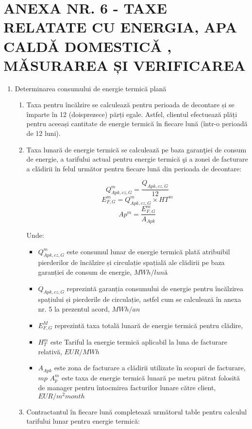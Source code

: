 \section{ANEXA NR. 6 - TAXE RELATATE CU ENERGIA, APA CALDĂ DOMESTICĂ , MĂSURAREA ȘI VERIFICAREA}

\begin{enumerate}

\item Determinarea consumului de energie termică plană

  \begin{enumerate}
  \item Taxa pentru încălzire se calculează pentru perioada de decontare și se împarte în 12 (doisprezece) părți egale. Astfel, clientul efectuează plăți pentru aceeași cantitate de energie termică în fiecare lună (într-o perioadă de 12 luni).
  \item  Taxa lunară de energie termică se calculează pe  baza garanţiei de consum de energie, a tarifului actual pentru  energie termică şi a zonei de facturare a clădirii în felul următor pentru fiecare lună din perioada de decontare:

\[ Q^{m}_{Apk,cz,G} = \frac{Q_{Apk,cz,G}}{12} \]
\[ E^{m}_{F,G} = Q^{m}_{Apk,cz,G} \times HT^m \]
\[ Ap^m = \frac{E^{m}_{F,G} }{A_{Apk}} \]

Unde:
\begin{itemize}[label={}]
  \item $Q^{m}_{Apk,cz, G}$ \quad este consumul lunar de energie termică plată atribuibil pierderilor de încălzire și circulație spațială ale clădirii pe baza garanției de consum de energie, $MWh/lună$
  \item $Q_{Apk,cz, G}$ \quad reprezintă garanția consumului de energie pentru încălzirea spațiului și   pierderile de circulație, astfel cum se calculează în anexa nr. 5 la prezentul acord, $MWh/an$
  \item $E^{M}_{F, G}$ \quad reprezintă taxa totală lunară de energie termică pentru clădire,
  \item $H_{T}^{m}$ \quad este Tariful la energie termică aplicabil la luna de facturare relativă, $EUR/MWh$
  \item $A_{Apk}$ \quad este zona de facturare a clădirii utilizate în scopuri de facturare, $mp$
$A_{p}^{m}$ este taxa de energie termică lunară pe metru pătrat folosită de manager pentru întocmirea facturilor lunare către client, $EUR/m^{2}month$
\end{itemize}

  \item Contractantul în fiecare lună completează următorul table pentru calculul tarifului lunar pentru energie termică:


\end{enumerate}
\end{enumerate}
